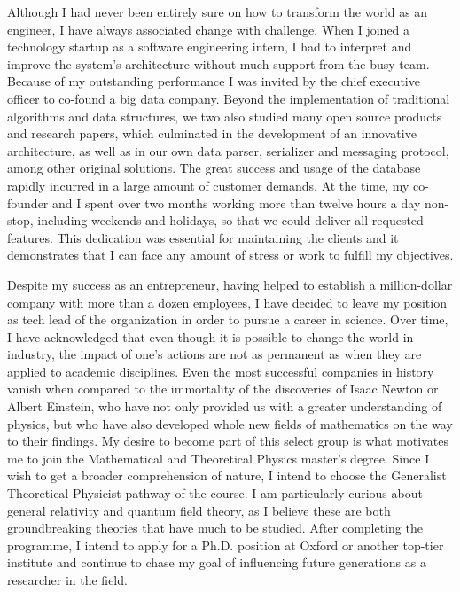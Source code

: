 \documentclass[10pt]{article}
\newcommand*{\NEWLINE}{\vspace{0.75em}}
\begin{document}
Although I had never been entirely sure on how to transform the world as an engineer, I have always associated change with challenge. When I joined a technology startup as a software engineering intern, I had to interpret and improve the system's architecture without much support from the busy team. Because of my outstanding performance I was invited by the chief executive officer to co-found a big data company. Beyond the implementation of traditional algorithms and data structures, we two also studied many open source products and research papers, which culminated in the development of an innovative architecture, as well as in our own data parser, serializer and messaging protocol, among other original solutions. The great success and usage of the database rapidly incurred in a large amount of customer demands. At the time, my co-founder and I spent over two months working more than twelve hours a day non-stop, including weekends and holidays, so that we could deliver all requested features. This dedication was essential for maintaining the clients and it demonstrates that I can face any amount of stress or work to fulfill my objectives. \NEWLINE{}

Despite my success as an entrepreneur, having helped to establish a million-dollar company with more than a dozen employees, I have decided to leave my position as tech lead of the organization in order to pursue a career in science. Over time, I have acknowledged that even though it is possible to change the world in industry, the impact of one's actions are not as permanent as when they are applied to academic disciplines. Even the most successful companies in history vanish when compared to the immortality of the discoveries of Isaac Newton or Albert Einstein, who have not only provided us with a greater understanding of physics, but who have also developed whole new fields of mathematics on the way to their findings. My desire to become part of this select group is what motivates me to join the Mathematical and Theoretical Physics master's degree. Since I wish to get a broader comprehension of nature, I intend to choose the Generalist Theoretical Physicist pathway of the course. I am particularly curious about general relativity and quantum field theory, as I believe these are both groundbreaking theories that have much to be studied. After completing the programme, I intend to apply for a Ph.D. position at Oxford or another top-tier institute and continue to chase my goal of influencing future generations as a researcher in the field.
\end{document}
